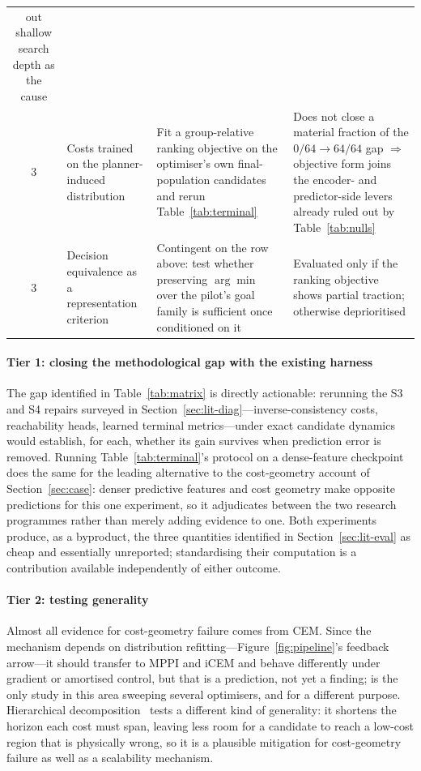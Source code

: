 \documentclass[11pt,letterpaper]{article}
\begin{document}
\begin{table}[t]
\begin{tabularx}{\textwidth}{@{}c L{3.0cm} L{3.5cm} Y@{}}
out shallow search depth as the cause \\
3 & Costs trained on the planner-induced distribution & Fit a group-relative
ranking objective on the optimiser's own final-population candidates and
rerun Table~\ref{tab:terminal} & Does not close a material fraction of the
$0/64\rightarrow 64/64$ gap $\Rightarrow$ objective form joins the encoder-
and predictor-side levers already ruled out by Table~\ref{tab:nulls} \\
3 & Decision equivalence as a representation criterion & Contingent on the
row above: test whether preserving $\arg\min$ over the pilot's goal family is
sufficient once conditioned on it & Evaluated only if the ranking objective
shows partial traction; otherwise deprioritised \\
\bottomrule
\end{tabularx}
\end{table}

\paragraph{Tier 1: closing the methodological gap with the existing harness}
The gap identified in Table~\ref{tab:matrix} is directly actionable: rerunning
the S3 and S4 repairs surveyed in Section~\ref{sec:lit-diag}---inverse-consistency
costs, reachability heads, learned terminal metrics---under exact candidate
dynamics would establish, for each, whether its gain survives when prediction
error is removed. Running Table~\ref{tab:terminal}'s protocol on a
dense-feature checkpoint~\citep{murlabadia2026vjepa21} does the same for the
leading alternative to the cost-geometry account of Section~\ref{sec:case}:
denser predictive features and cost geometry make opposite predictions for
this one experiment, so it adjudicates between the two research programmes
rather than merely adding evidence to one. Both experiments produce, as a
byproduct, the three quantities identified in Section~\ref{sec:lit-eval} as
cheap and essentially unreported; standardising their computation is a
contribution available independently of either outcome.

\paragraph{Tier 2: testing generality}
Almost all evidence for cost-geometry failure comes from CEM. Since the
mechanism depends on distribution refitting---Figure~\ref{fig:pipeline}'s
feedback arrow---it should transfer to MPPI and iCEM and behave differently
under gradient or amortised control, but that is a prediction, not yet a
finding; \citet{nguyen2026latentgeometry} is the only study in this area
sweeping several optimisers, and for a different purpose. Hierarchical
decomposition~\citep{zhang2026hwm} tests a different kind of generality: it
shortens the horizon each cost must span, leaving less room for a candidate
to reach a low-cost region that is physically wrong, so it is a plausible
mitigation for cost-geometry failure as well as a scalability mechanism.
\end{document}
